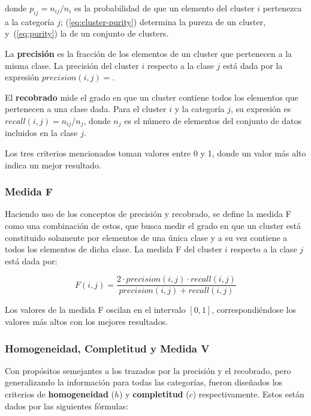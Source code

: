 \noindent
donde  $p_{ij} = n_{ij}/n_i$ es la probabilidad de que un elemento del cluster $i$ pertenezca a la categoría $j$;
(\ref{eq:cluster-purity}) determina la pureza de un cluster, y~(\ref{eq:purity}) la de un conjunto de clusters.

La \textbf{precisión} es la fracción de los elementos de un cluster que pertenecen a la misma clase.
La precisión del cluster $i$ respecto a la clase $j$ está dada por la expresión $precision(i,j) = $.

El \textbf{recobrado} mide el grado en que un cluster contiene todos los elementos que pertenecen a una clase dada.
Para el cluster $i$ y la categoría $j$, su expresión es $recall(i,j) = n_{ij}/n_j$, donde $n_j$ es el número de elementos del conjunto de datos incluidos en la clase $j$.

Los tres criterios mencionados toman valores entre 0 y 1, donde un valor más alto indica un mejor resultado.

\subsubsection{Medida F}

Haciendo uso de los conceptos de precisión y recobrado, se define la medida F como una combinación de estos, que busca medir el grado en que un cluster está constituido solamente por elementos de una única clase y a su vez contiene a todos los elementos de dicha clase.
La medida F del cluster $i$ respecto a la clase $j$ está dada por:

\begin{equation}
    \label{eq:F-measure}
    F(i,j) = \frac{2 \cdot precision(i,j) \cdot recall(i,j)}{precision(i,j) + recall(i,j)}
\end{equation}

Los valores de la medida F oscilan en el intervalo $[0,1]$, correspondiéndose los valores más altos con los mejores resultados.

\subsubsection{Homogeneidad, Completitud y Medida V}

Con propósitos semejantes a los trazados por la precisión y el recobrado, pero generalizando la información para todas las categorías, fueron diseñados los criterios de \textbf{homogeneidad} ($h$) y \textbf{completitud} ($c$) respectivamente.
Estos están dados por las siguientes fórmulas:

